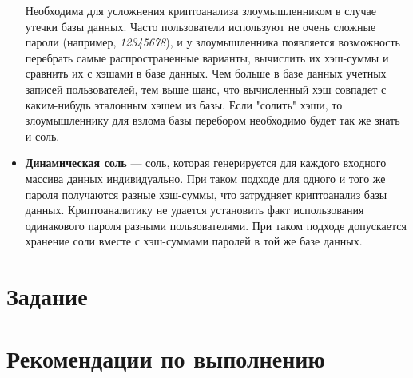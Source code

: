 \documentclass[14pt]{extarticle}
\begin{document}
\begin{itemize}
  
  Необходима для усложнения криптоанализа злоумышленником в случае утечки
  базы данных.
  Часто пользователи используют не очень сложные пароли (например,
  \textit{12345678}), и у злоумышленника появляется возможность перебрать
  самые распространенные варианты, вычислить их хэш-суммы и сравнить их с хэшами
  в базе данных\footnotemark{}.
  Чем больше в базе данных учетных записей пользователей, тем выше шанс, что
  вычисленный хэш совпадет с каким-нибудь эталонным хэшем из базы.
  Если "солить" хэши, то злоумышленнику для взлома базы перебором необходимо
  будет так же знать и соль.


 \item \textbf{Динамическая соль} --- соль, которая генерируется для каждого
  входного массива данных индивидуально.
  При таком подходе для одного и того же пароля получаются разные хэш-суммы,
  что затрудняет криптоанализ базы данных.
  Криптоаналитику не удается установить факт использования одинакового пароля
  разными пользователями.
  При таком подходе допускается хранение соли вместе с хэш-суммами паролей
  в той же базе данных.

\end{itemize}

\section{Задание}

\section{Рекомендации по выполнению}
\end{document}
